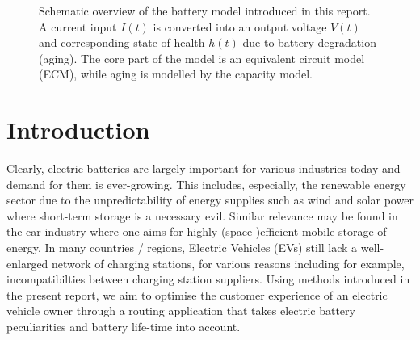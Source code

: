 \documentclass{prettytex/ox/mmsc-special-topic}
\title{\topictitle}
\author{Candidate \candidatenumber}
\date{\today}
\begin{document}
  \pagestyle{plain}
  \mmscSpecialHeader[casestudy]

  \begin{abstract}
    \label{abstract}
    This work will attempt to

    The first part of this report will focus on the model for the battery which was the main focus of our project. The second part is the route optimisation problem in the context of electric vehicles.


    The model was implemented in Python and there is a graphical user interface available that provides live insight into the model (cf. ).
  \end{abstract}

  \begin{figure}[H]
    \centering
    \caption{Schematic overview of the battery model introduced in this report. A current input $I(t)$ is converted into an output voltage $V(t)$ and corresponding state of health $h(t)$ due to battery degradation (aging). The core part of the model is an equivalent circuit model (ECM), while aging is modelled by the capacity model.}
    \label{fig:model-overview}
  \end{figure}


  \pagebreak
  \pagestyle{normal}

  \section{Introduction}
  Clearly, electric batteries are largely important for various industries today and demand for them is ever-growing.
  This includes, especially, the renewable energy sector due to the unpredictability of energy supplies such as wind and solar power where short-term storage is a necessary evil.
  Similar relevance may be found in the car industry where one aims for highly (space-)efficient mobile storage of energy.
  In many countries / regions, Electric Vehicles (EVs) still lack a well-enlarged network of charging stations, for various reasons including for example, incompatibilties between charging station suppliers.
  Using methods introduced in the present report, we aim to optimise the customer experience of an electric vehicle owner through a routing application that takes electric battery peculiarities and battery life-time into account.
\end{document}
